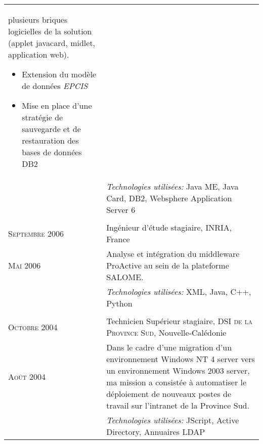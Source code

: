 \begin{longtable}{R{2.5cm}|p{14.8cm}}
{ 		plusieurs briques logicielles de la solution (applet javacard, midlet,
 		application web).
 	 	\begin{itemize}
			\item Extension du modèle de données \emph{EPCIS}
			\item Mise en place d'une stratégie de sauvegarde et de restauration des bases de données DB2
		\end{itemize}
		\vspace{-1em}
	}\\&
 	\footnotesize{\emph{Technologies utilisées:} Java ME, Java Card, DB2, Websphere Application Server 6 }\\
   \\
  	\textsc{Septembre 2006} & Ingénieur d'étude stagiaire, \textsc{INRIA}, France\\
  	\textsc{Mai 2006}&\footnotesize{Analyse et intégration du middleware ProActive au sein de la plateforme SALOME.}\\&
  	\footnotesize{\emph{Technologies utilisées:} XML, Java, C++, Python}\\
  \\
 	\textsc{Octobre 2004} & Technicien Supérieur stagiaire, \textsc{DSI de la Province Sud}, Nouvelle-Calédonie\\
 	\textsc{Août 2004}&\footnotesize{Dans le cadre d'une migration d'un environnement Windows NT 4 server vers un environnement Windows 
 	2003 server, ma mission a consistée à automatiser le déploiement de nouveaux postes de travail sur l'intranet de la Province Sud. }\\&
 	\footnotesize{\emph{Technologies utilisées:} JScript, Active Directory, Annuaires LDAP}\\
\end{longtable}